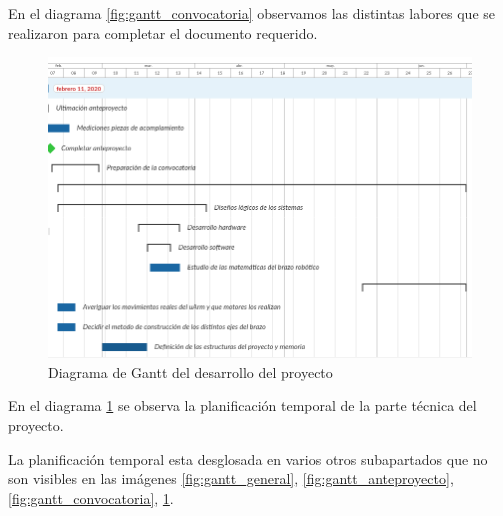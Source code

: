 En el diagrama \ref{fig:gantt_convocatoria} observamos las distintas labores que se realizaron para completar el documento requerido. 

\begin{figure}[H]
    \centering
    \includegraphics[width=1\linewidth]{pictures/DesarrolloProyecto.png}
    \caption{Diagrama de Gantt del desarrollo del proyecto}
    \label{fig:gantt_proyecto}
\end{figure}

En el diagrama \ref{fig:gantt_proyecto} se observa la planificación temporal de la parte técnica del proyecto.

La planificación temporal esta desglosada en varios otros subapartados que no son visibles en las imágenes \ref{fig:gantt_general},  \ref{fig:gantt_anteproyecto}, \ref{fig:gantt_convocatoria}, \ref{fig:gantt_proyecto}.

